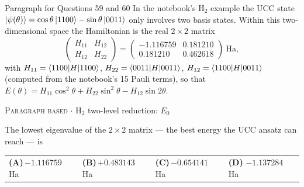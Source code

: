 \documentclass[11pt,a4paper]{article}
\newcommand{\optlabel}[1]{\textbf{(#1)}}
\newcommand{\correctlabel}[1]{\textcolor{okgreen}{\textbf{(#1)}\,\ding{51}}}
\newenvironment{qitem}[1]{\begin{list}{}{\setlength{\leftmargin}{3.3em}\setlength{\labelwidth}{3.1em}%
  \setlength{\labelsep}{0.2em}\setlength{\topsep}{3pt}\setlength{\parsep}{3pt}}\item[\textbf{Q.#1}\hfill]}{\end{list}}
\newcommand{\qmeta}[2]{{\footnotesize\color{black!60}\textsc{#1} \;$\cdot$\; #2}\par}
\begin{document}
\begin{passagebox}{Paragraph for Questions 59 and 60}
In the notebook's H$_2$ example the UCC state $\ket{\psi(\theta)} = \cos\theta\ket{1100} - \sin\theta\ket{0011}$ only involves two basis states. Within
this two-dimensional space the Hamiltonian is the real $2\times2$ matrix
\[ \begin{pmatrix} H_{11} & H_{12}\\ H_{12} & H_{22}\end{pmatrix} = \begin{pmatrix} -1.116759 & 0.181210\\ 0.181210 & 0.462618\end{pmatrix}\ \text{Ha}, \]
with $H_{11} = \braket{1100|H|1100}$, $H_{22} = \braket{0011|H|0011}$, $H_{12} = \braket{1100|H|0011}$ (computed from the notebook's 15 Pauli terms), so that
$E(\theta) = H_{11}\cos^2\theta + H_{22}\sin^2\theta - H_{12}\sin2\theta$.
\end{passagebox}
\begin{qitem}{59}
\qmeta{Paragraph based}{H$_2$ two-level reduction: $E_0$}
The lowest eigenvalue of the $2\times2$ matrix --- the best energy the UCC ansatz can reach --- is
\par\smallskip\noindent\begin{tabularx}{\linewidth}{@{}*{4}{L}@{}}
\optlabel{A}\,$-1.116759$ Ha & \optlabel{B}\,$+0.483143$ Ha & \optlabel{C}\,$-0.654141$ Ha & \correctlabel{D}\,$-1.137284$ Ha
\end{tabularx}
\end{qitem}
\end{document}
